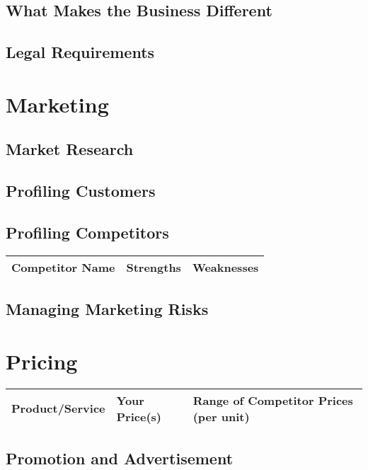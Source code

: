 \documentclass[DIV=calc, paper=a4, fontsize=11pt]{scrartcl}	 %
\begin{document}
\subsection{What Makes the Business Different}

\subsection{Legal Requirements}


\section{Marketing}

\subsection{Market Research}

\subsection{Profiling Customers}

\subsection{Profiling Competitors}
\begin{tabular}{|l|l|l|} \hline
Competitor Name & Strengths & Weaknesses \\ \hline
\end{tabular}

\subsection{Managing Marketing Risks}

\section{Pricing}

\begin{tabular}{|l|l|l|} \hline
Product/Service & Your Price(s) & Range of Competitor Prices (per unit) \\ \hline
\end{tabular}

\subsection{Promotion and Advertisement}
\end{document}
